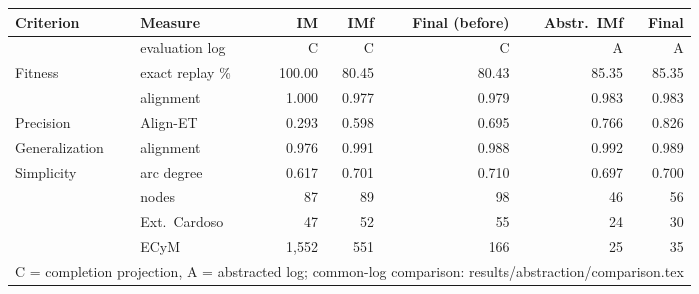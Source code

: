 \begin{tabular}{llrrrrr}
\hline
Criterion & Measure & IM & IMf & Final (before) & Abstr.\ IMf & Final \\
\hline
& evaluation log & C & C & C & A & A \\
Fitness & exact replay \% & 100.00 & 80.45 & 80.43 & 85.35 & 85.35 \\
 & alignment & 1.000 & 0.977 & 0.979 & 0.983 & 0.983 \\
Precision & Align-ET & 0.293 & 0.598 & 0.695 & 0.766 & 0.826 \\
Generalization & alignment & 0.976 & 0.991 & 0.988 & 0.992 & 0.989 \\
Simplicity & arc degree & 0.617 & 0.701 & 0.710 & 0.697 & 0.700 \\
 & nodes & 87 & 89 & 98 & 46 & 56 \\
 & Ext.\ Cardoso & 47 & 52 & 55 & 24 & 30 \\
 & ECyM & 1,552 & 551 & 166 & 25 & 35 \\
\hline
\multicolumn{7}{l}{C = completion projection, A = abstracted log; common-log comparison: results/abstraction/comparison.tex} \\
\hline
\end{tabular}
